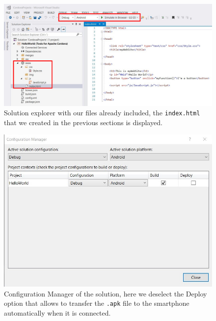 \begin{figure}
    \centering
    \includegraphics[width= \textwidth]{Figures/Cordova4}
    \caption{Solution explorer with our files already included, the \texttt{index.html} that we created in the previous sections is displayed.}
    \label{fig:Cordova4}
\end{figure}

\begin{figure}
    \centering
    \includegraphics[width=0.8 \textwidth]{Figures/Cordova5}
    \caption{Configuration Manager of the solution, here we deselect the Deploy option that allows to transfer the \texttt{.apk} file to the smartphone automatically when it is connected.}
    \label{fig:Cordova5}
\end{figure}

